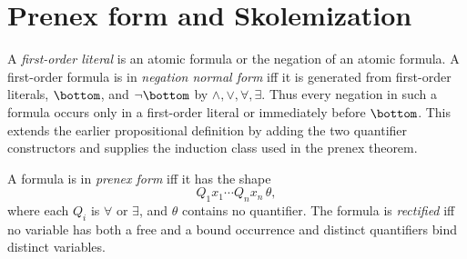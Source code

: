 \section{Prenex form and Skolemization}
\label{sec:fol-cardinality-normalforms-03}

\begin{definition}
A \emph{first-order literal} is an atomic formula or the negation of an
atomic formula.  A first-order formula is in \emph{negation normal form} iff
it is generated from first-order literals, \(\bottom\), and
\(\neg\bottom\) by \(\land,\lor,\forall,\exists\).  Thus every negation in
such a formula occurs only in a first-order literal or immediately before
\(\bottom\).  This extends the earlier propositional definition by adding
the two quantifier constructors and supplies the induction class used in the
prenex theorem.
\end{definition}

\begin{definition}
A formula is in \emph{prenex form} iff it has the shape
\[
 Q_1x_1\cdots Q_nx_n\,\theta,
\]
where each \(Q_i\) is \(\forall\) or \(\exists\), and \(\theta\) contains no
quantifier.  The formula is \emph{rectified} iff no variable has both a free
and a bound occurrence and distinct quantifiers bind distinct variables.
\end{definition}

